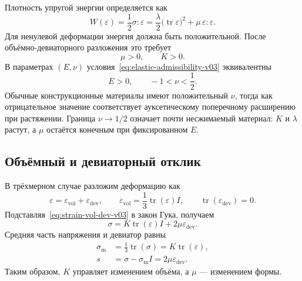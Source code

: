 Плотность упругой энергии определяется как
\begin{equation}
\label{eq:elastic-energy-density-v03}
 W(\varepsilon)
 =\frac12\sigma:\varepsilon
 =\frac{\lambda}{2}\bigl(\operatorname{tr}\varepsilon\bigr)^2
  +\mu\,\varepsilon:\varepsilon.
\end{equation}
Для ненулевой деформации энергия должна быть положительной. После объёмно-девиаторного разложения это требует
\begin{equation}
\label{eq:elastic-admissibility-v03}
 \mu>0,
 \qquad
 K>0.
\end{equation}
В параметрах $(E,\nu)$ условия~\eqref{eq:elastic-admissibility-v03} эквивалентны
\begin{equation}
\label{eq:young-poisson-admissibility-v03}
 E>0,
 \qquad
 -1<\nu<\frac12.
\end{equation}
Обычные конструкционные материалы имеют положительный $\nu$, тогда как отрицательное значение соответствует ауксетическому поперечному расширению при растяжении. Граница $\nu\to1/2$ означает почти несжимаемый материал: $K$ и $\lambda$ растут, а $\mu$ остаётся конечным при фиксированном $E$.

\subsection{Объёмный и девиаторный отклик}

В трёхмерном случае разложим деформацию как
\begin{equation}
\label{eq:strain-vol-dev-v03}
 \varepsilon
 =\varepsilon_{\mathrm{vol}}+\varepsilon_{\mathrm{dev}},
 \qquad
 \varepsilon_{\mathrm{vol}}
 =\frac13\operatorname{tr}(\varepsilon)I,
 \qquad
 \operatorname{tr}(\varepsilon_{\mathrm{dev}})=0.
\end{equation}
Подставляя~\eqref{eq:strain-vol-dev-v03} в закон Гука, получаем
\begin{equation}
\label{eq:hooke-vol-dev-v03}
 \sigma
 =K\operatorname{tr}(\varepsilon)I
  +2\mu\varepsilon_{\mathrm{dev}}.
\end{equation}
Средняя часть напряжения и девиатор равны
\begin{align}
 \sigma_{\mathrm{m}}
 &=\frac13\operatorname{tr}(\sigma)
 =K\operatorname{tr}(\varepsilon),
 \label{eq:mean-stress-v03}\\
 s
 &=\sigma-\sigma_{\mathrm{m}}I
 =2\mu\varepsilon_{\mathrm{dev}}.
 \label{eq:stress-deviator-v03}
\end{align}
Таким образом, $K$ управляет изменением объёма, а $\mu$ --- изменением формы.

